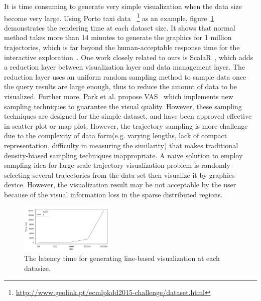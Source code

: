 It is time consuming to generate very simple visualization when the data size become very large. Using Porto taxi data ~\footnote{\url{http://www.geolink.pt/ecmlpkdd2015-challenge/dataset.html}} as an example, figure~\ref{fig:rendering_time} demonstrates the rendering time at each dataset size. It shows that normal method takes more than 14 minutes to generate the graphics for 1 million trajectories, which is far beyond the human-acceptable response time for the interactive exploration~\cite{shneiderman1984response}.
One work closely related to ours is ScalaR~\cite{battle2013dynamic}, which adds a reduction layer between visualization layer and data management layer. The reduction layer uses an uniform random sampling method to sample data once the query results are large enough, thus to reduce the amount of data to be visualized.
Further more, Park et al. propose VAS~\cite{park2016visualization} which implements new sampling techniques to guarantee the visual quality. However, these sampling techniques are designed for the simple dataset, and have been approved effective in scatter plot or map plot. However, the trajectory sampling is more challenge due to the complexity of data form(e.g. varying lengths, lack of compact representation, difficulty in measuring the similarity) that makes traditional density-biased sampling techniques inappropriate. 
A naive solution to employ sampling idea for large-scale trajectory visualization problem is randomly selecting several trajectories from the data set then visualize it by graphics device.
However, the visualization result may be not acceptable by the user because of the visual information loss in the sparse distributed regions.


\begin{figure}[t]
	\centering
	\includegraphics[width=0.4\textwidth]{pictures/introduction/timesize.png}
	\vspace{-5mm}
	\caption{The latency time for generating line-based visualization at each datasize.}
	\vspace{-5mm}
	\label{fig:rendering_time}
\end{figure}

